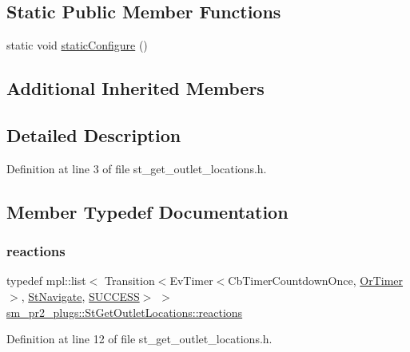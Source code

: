 \subsection*{Static Public Member Functions}
\begin{DoxyCompactItemize}
\item 
static void \hyperlink{structsm__pr2__plugs_1_1StGetOutletLocations_ae798350a0b8946793b6bf37e678d1910}{static\+Configure} ()
\end{DoxyCompactItemize}
\subsection*{Additional Inherited Members}


\subsection{Detailed Description}


Definition at line 3 of file st\+\_\+get\+\_\+outlet\+\_\+locations.\+h.



\subsection{Member Typedef Documentation}
\mbox{\label{structsm__pr2__plugs_1_1StGetOutletLocations_ac47595196c2aa76d0c1515c7bdd55542}} 
\subsubsection{\texorpdfstring{reactions}{reactions}}
{\footnotesize\ttfamily typedef mpl\+::list$<$ Transition$<$Ev\+Timer$<$Cb\+Timer\+Countdown\+Once, \hyperlink{classsm__pr2__plugs_1_1OrTimer}{Or\+Timer}$>$, \hyperlink{structsm__pr2__plugs_1_1StNavigate}{St\+Navigate}, \hyperlink{classSUCCESS}{S\+U\+C\+C\+E\+SS}$>$ $>$ \hyperlink{structsm__pr2__plugs_1_1StGetOutletLocations_ac47595196c2aa76d0c1515c7bdd55542}{sm\+\_\+pr2\+\_\+plugs\+::\+St\+Get\+Outlet\+Locations\+::reactions}}



Definition at line 12 of file st\+\_\+get\+\_\+outlet\+\_\+locations.\+h.



